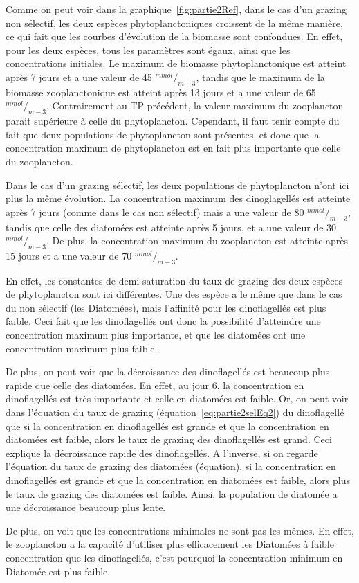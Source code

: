 \par{
Comme on peut voir dans la graphique~\ref{fig:partie2Ref}, 
dans le cas d'un grazing non s\'electif, les deux espèces phytoplanctoniques croissent de la même manière,
ce qui fait que les courbes d'évolution de la biomasse sont confondues. En effet, pour les deux espèces,
tous les paramètres sont égaux, ainsi que les concentrations initiales. Le maximum de biomasse
phytoplanctonique est atteint après 7 jours et a une valeur de 45 ${^{mmol}}/_{m-3}$, tandis que le maximum
de la biomasse zooplanctonique est atteint après 13 jours et a une valeur de 65 ${^{mmol}}/_{m-3}$.
Contrairement au TP précédent, la valeur maximum du zooplancton parait supérieure à celle du phytoplancton.
Cependant, il faut tenir compte du fait que deux populations de phytoplancton sont présentes, et donc que
la concentration maximum de phytoplancton est en fait plus importante que celle du zooplancton.
}
\par{
Dans le cas d'un grazing s\'electif, les deux populations de phytoplancton n'ont ici plus la même évolution.
La concentration maximum des dinoglagellés est atteinte après 7 jours (comme dans le cas non sélectif)
mais a une valeur de 80 ${^{mmol}}/_{m-3}$, tandis que celle des diatomées est atteinte après 5 jours, et a une
valeur de 30 ${^{mmol}}/_{m-3}$. De plus, la concentration maximum du zooplancton est atteinte après 15 jours
et a une valeur de 70 ${^{mmol}}/_{m-3}$.
}
\par{
En effet, les constantes de demi saturation du taux de grazing des deux espèces de phytoplancton sont
ici différentes. Une des espèce a le même que dans le cas du non sélectif (les Diatomées), mais
l'affinité pour les dinoflagellés est plus faible. Ceci fait que les dinoflagellés ont donc la possibilité
d'atteindre une concentration maximum plus importante, et que les diatomées ont une concentration maximum
plus faible.
}
\par{
De plus, on peut voir que la décroissance des dinoflagellés est beaucoup plus rapide que celle des
diatomées. En effet, au jour 6, la concentration en dinoflagellés est très importante et celle en
diatomées est faible. Or, on peut voir dans l'équation du taux de grazing (équation~\ref{eq:partie2selEq2})
du dinoflagellé que si la concentration en dinoflagellés est grande et que la concentration en diatomées
est faible, alors le taux de grazing des dinoflagellés est grand. Ceci explique la décroissance
rapide des dinoflagellés. A l'inverse, si on regarde l'équation du taux de grazing des diatomées
(équation), si la concentration en dinoflagellés est grande et que la concentration en diatomées
est faible, alors plus le taux de grazing des diatomées est faible. Ainsi, la population de diatomée a
une décroissance beaucoup plus lente.
}
\par{
De plus, on voit que les concentrations minimales ne sont pas les mêmes. En effet, le zooplancton a la
capacité d'utiliser plus efficacement les Diatomées à faible concentration que les dinoflagellés,
c'est pourquoi la concentration minimum en Diatomée est plus faible.
}

